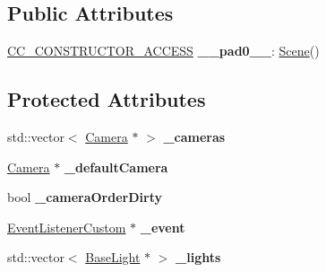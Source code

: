 \subsection*{Public Attributes}
\begin{DoxyCompactItemize}
\item 
\mbox{\label{classScene_a2c65206afdfe953e789b48e29dae981b}} 
\hyperlink{_2cocos2d_2cocos_2base_2ccConfig_8h_a25ef1314f97c35a2ed3d029b0ead6da0}{C\+C\+\_\+\+C\+O\+N\+S\+T\+R\+U\+C\+T\+O\+R\+\_\+\+A\+C\+C\+E\+SS} {\bfseries \+\_\+\+\_\+pad0\+\_\+\+\_\+}\+: \hyperlink{classScene}{Scene}()
\end{DoxyCompactItemize}
\subsection*{Protected Attributes}
\begin{DoxyCompactItemize}
\item 
\mbox{\label{classScene_a086c90a9f5fc73d651831dd12577199a}} 
std\+::vector$<$ \hyperlink{classCamera}{Camera} $\ast$ $>$ {\bfseries \+\_\+cameras}
\item 
\mbox{\label{classScene_a0394ee6eb43b1ad5819b843ac3ea4e0a}} 
\hyperlink{classCamera}{Camera} $\ast$ {\bfseries \+\_\+default\+Camera}
\item 
\mbox{\label{classScene_a580f60981224bf3847690322b5ca7e5c}} 
bool {\bfseries \+\_\+camera\+Order\+Dirty}
\item 
\mbox{\label{classScene_a0f7bdc773795aeb090f516609b90108f}} 
\hyperlink{classEventListenerCustom}{Event\+Listener\+Custom} $\ast$ {\bfseries \+\_\+event}
\item 
\mbox{\label{classScene_a98676793cda9b427d94e7b21c60c2a69}} 
std\+::vector$<$ \hyperlink{classBaseLight}{Base\+Light} $\ast$ $>$ {\bfseries \+\_\+lights}
\end{DoxyCompactItemize}

